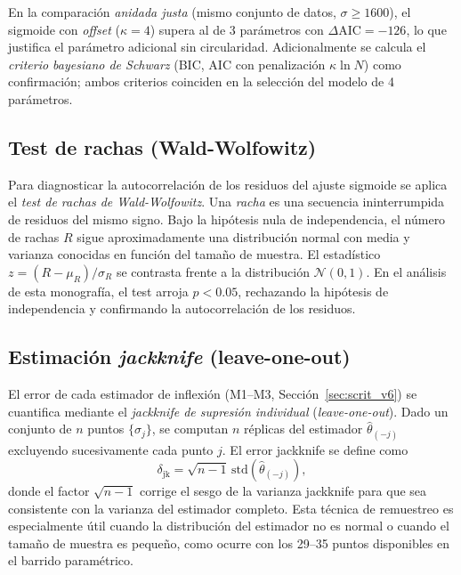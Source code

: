 \primerparrafo En la comparación \emph{anidada justa} (mismo conjunto de datos, $\sigma\ge1600$), el sigmoide con \emph{offset} ($\kappa=4$) supera al de 3 parámetros con $\Delta\mathrm{AIC}=-126$, lo que justifica el parámetro adicional sin circularidad. Adicionalmente se calcula el \emph{criterio bayesiano de Schwarz} (BIC, $\mathrm{AIC}$ con penalización $\kappa\ln N$) como confirmación; ambos criterios coinciden en la selección del modelo de 4 parámetros.

\subsection{Test de rachas (Wald-Wolfowitz)}
\label{ap:est:rachas}

\primerparrafo Para diagnosticar la autocorrelación de los residuos del ajuste sigmoide se aplica el \emph{test de rachas de Wald-Wolfowitz}. Una \emph{racha} es una secuencia ininterrumpida de residuos del mismo signo. Bajo la hipótesis nula de independencia, el número de rachas $R$ sigue aproximadamente una distribución normal con media y varianza conocidas en función del tamaño de muestra. El estadístico $z=(R-\mu_R)/\sigma_R$ se contrasta frente a la distribución $\mathcal{N}(0,1)$. En el análisis de esta monografía, el test arroja $p<0.05$, rechazando la hipótesis de independencia y confirmando la autocorrelación de los residuos.

\subsection{Estimación \emph{jackknife} (leave-one-out)}
\label{ap:est:jackknife}

\primerparrafo El error de cada estimador de inflexión (M1--M3, Sección~\ref{sec:scrit_v6}) se cuantifica mediante el \emph{jackknife de supresión individual} (\emph{leave-one-out}). Dado un conjunto de $n$ puntos $\{\sigma_j\}$, se computan $n$ réplicas del estimador $\hat\theta_{(-j)}$ excluyendo sucesivamente cada punto $j$. El error jackknife se define como
\begin{equation}
    \delta_{\mathrm{jk}} = \sqrt{n-1}\,\mathrm{std}(\hat\theta_{(-j)}),
\end{equation}
donde el factor $\sqrt{n-1}$ corrige el sesgo de la varianza jackknife para que sea consistente con la varianza del estimador completo. Esta técnica de remuestreo es especialmente útil cuando la distribución del estimador no es normal o cuando el tamaño de muestra es pequeño, como ocurre con los 29--35 puntos disponibles en el barrido paramétrico.

